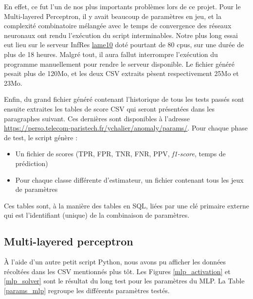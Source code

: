 \documentclass[a4paper]{report}
\begin{document}
En effet, ce fut l'un de nos plus importants problèmes lors de ce projet. Pour le Multi-layered Perceptron, il y avait beaucoup de paramètres en jeu, et la complexité combinatoire mélangée avec le temps de convergence des réseaux neuronaux ont rendu l'exécution du script interminables. Notre plus long essai eut lieu sur le serveur InfRes \href{http://lame10.enst.fr}{lame10} doté pourtant de 80 cpus, sur une durée de plus de 18 heures. Malgré tout, il aura fallut interrompre l'exécution du programme manuellement pour rendre le serveur disponible. Le fichier généré pesait plus de 120Mo, et les deux CSV extraits pèsent respectivement 25Mo et 23Mo.

Enfin, du grand fichier généré contenant l'historique de tous les tests passés sont ensuite extraites les tables de score CSV qui seront présentées dans les paragraphes suivant. Ces dernières sont disponibles à l'adresse \url{https://perso.telecom-paristech.fr/ychalier/anomaly/params/}. Pour chaque phase de test, le script génère :
\begin{itemize}
\item Un fichier de scores (TPR, FPR, TNR, FNR, PPV, \emph{f1-score}, temps de prédiction)
\item Pour chaque classe différente d'estimateur, un fichier contenant tous les jeux de paramètres
\end{itemize}
Ces tables sont, à la manière des tables en SQL, liées par une clé primaire externe qui est l'identifiant (unique) de la combinaison de paramètres.


\subsection{Multi-layered perceptron}

À l'aide d'un autre petit script Python, nous avons pu afficher les données récoltées dans les CSV mentionnés plus tôt. Les Figures \ref{mlp_activation} et \ref{mlp_solver} sont le résultat du long test pour les paramètres du MLP. La Table \ref{params_mlp} regroupe les différents paramètres testés.
\end{document}
